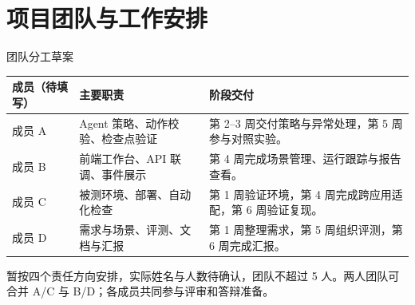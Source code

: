 \section{项目团队与工作安排}
\begin{frame}{团队分工草案}
\small
\begin{tabularx}{\textwidth}{lXX}
\toprule
成员（待填写） & 主要职责 & 阶段交付 \\
\midrule
成员 A & Agent 策略、动作校验、检查点验证 & 第 2--3 周交付策略与异常处理，第 5 周参与对照实验。\\
成员 B & 前端工作台、API 联调、事件展示 & 第 4 周完成场景管理、运行跟踪与报告查看。\\
成员 C & 被测环境、部署、自动化检查 & 第 1 周验证环境，第 4 周完成跨应用适配，第 6 周验证复现。\\
成员 D & 需求与场景、评测、文档与汇报 & 第 1 周整理需求，第 5 周组织评测，第 6 周完成汇报。\\
\bottomrule
\end{tabularx}
\vfill
\small 暂按四个责任方向安排，实际姓名与人数待确认，团队不超过 5 人。两人团队可合并 A/C 与 B/D；各成员共同参与评审和答辩准备。
\end{frame}

